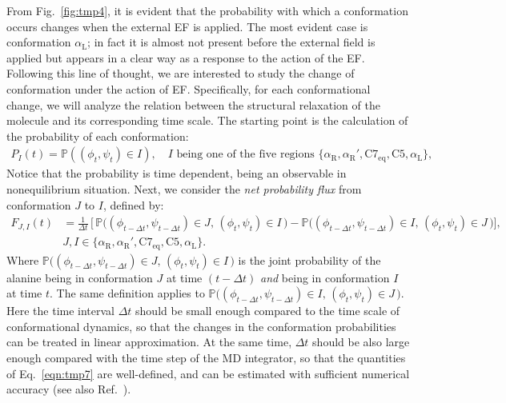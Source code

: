 \documentclass[journal=jctcce,manuscript=manuscript]{achemso}
\newcommand{\confaa}[0]{{\alpha_{\textrm{R}}}}
\newcommand{\confab}[0]{{\alpha_{\textrm{R}}'}}
\newcommand{\confba}[0]{{\textrm{C}7_{\textrm{eq}}}}
\newcommand{\confbb}[0]{{\textrm{C}5}}
\newcommand{\confc}[0]{{\alpha_{\textrm{L}}}}
\begin{document}
From Fig.~\ref{fig:tmp4}, it is evident that the probability with which a
conformation occurs changes when the external EF is applied.
The most evident case is conformation $\confc$; in fact it is {almost} not present before the external field is applied but appears in a clear way as a response to the action of the EF. Following this line of thought, we are interested to study the change of conformation under the action of EF. Specifically, for each conformational change, we will analyze the relation between the structural relaxation of the molecule and its corresponding time scale. 
The starting point is the calculation of the probability
of each conformation:
\begin{align}
  P_I(t) = \mathbb P ( (\phi_t,\psi_t) \in I), \quad  I \textrm{ being one of the five regions } \{\confaa, \confab, \confba, \confbb, \confc\},
\end{align}
Notice that the probability is time dependent, being an observable in nonequilibrium situation.
Next,
we consider the \emph{net probability flux} from conformation $J$ to $I$, defined by:
\begin{align}\nonumber
  F_{J,I}(t) & = \frac1{\Delta t}\,
  \bigg[\,
  \mathbb P \big( (\phi_{t-\Delta t},\psi_{t-\Delta t}) \in J,\, (\phi_t, \psi_t) \in I \,\big) 
  -
  \mathbb P \big( (\phi_{t-\Delta t}, \psi_{t-\Delta t}) \in I,\, (\phi_t, \psi_t) \in J \,\big)
  \bigg], \\\label{eqn:tmp7}
  & J,I \in \{\confaa, \confab, \confba, \confbb, \confc\}.
\end{align}
Where $\mathbb P\big( (\phi_{t-\Delta t}, \psi_{t-\Delta t}) \in J,\, (\phi_t, \psi_t) \in I\,\big)$
is the joint probability of the alanine being in conformation $J$ at
time $(t-\Delta t)$ \emph{and} being in conformation $I$ at time $t$.
The same definition applies to
$\mathbb P \big( (\phi_{t-\Delta t}, \psi_{t-\Delta t}) \in I,\, (\phi_t, \psi_t) \in J\,\big)$.
Here the time interval $\Delta t$ should be small enough compared to the
time scale of conformational dynamics,
so that the changes in the conformation probabilities
can be treated in linear approximation.
At the same time,  $\Delta t$ should be also large enough compared with
the time step of the MD integrator, 
so that the quantities of Eq.~\eqref{eqn:tmp7} are well-defined, and can be
estimated with sufficient numerical accuracy (see also Ref.~\cite{schuette2011markov}).
\end{document}
